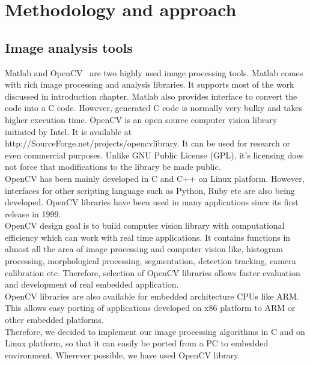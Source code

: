 
\chapter{Methodology and approach} %
\label{Chapter2}
\section{Image analysis tools}
\indent Matlab and OpenCV~\cite{34} are two highly used image
processing tools.  Matlab comes with rich image processing and analysis
libraries. It supports most of the work discussed in introduction
chapter. Matlab also provides interface to convert the code into a C
code. However, generated C code is normally very bulky and takes higher
execution time. OpenCV is an open source computer vision library
initiated by Intel. It is available at
http://SourceForge.net/projects/opencvlibrary. It can be used for
research or even commercial purposes. Unlike GNU Public License (GPL),
it's licensing does not force that modifications to the library be made
public. \\
\indent OpenCV has been mainly developed in C and C++ on Linux platform.
However, interfaces for other scripting language such as Python, Ruby
etc are also being developed. OpenCV libraries have been used in many
applications since its first release in 1999.\\
\indent OpenCV design goal is to build computer vision library with
computational efficiency which can work with real time applications. It
contains functions in almost all the area of image processing  and
computer vision like, histogram processing, morphological processing,
segmentation, detection tracking, camera calibration etc. Therefore,
selection of OpenCV libraries allows faster evaluation and development
of real embedded application.\\
\indent OpenCV libraries are also available for embedded architecture
CPUs like ARM. This allows easy porting of applications developed on x86
platform to ARM or other embedded platforms.\\
\indent Therefore, we decided to implement our image processing
algorithms in C and on Linux platform, so that it can easily be ported
from a PC to embedded environment. Wherever possible, we have used
OpenCV library.
